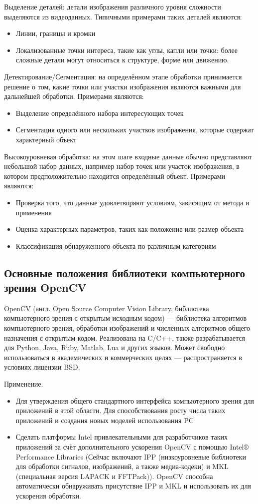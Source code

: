 \documentclass[12pt]{article}
\begin{document}
  Выделение деталей: детали изображения различного уровня сложности выделяются из видеоданных. Типичными примерами таких деталей являются:
\begin{itemize}
\item Линии, границы и кромки
\item Локализованные точки интереса, такие как углы, капли или точки: более сложные детали могут относиться к структуре, форме или движению.
\end{itemize}
Детектирование/Сегментация: на определённом этапе обработки принимается решение о том, какие точки или участки изображения являются важными для дальнейшей обработки. Примерами являются:
\begin{itemize}
\item Выделение определённого набора интересующих точек
\item Сегментация одного или нескольких участков изображения, которые содержат характерный объект
\end{itemize}

 Высокоуровневая обработка: на этом шаге входные данные обычно представляют небольшой набор данных, например набор точек или участок изображения, в котором предположительно находится определённый объект. Примерами являются:
\begin{itemize}
\item Проверка того, что данные удовлетворяют условиям, зависящим от метода и применения
\item Оценка характерных параметров, таких как положение или размер объекта
\item Классификация обнаруженного объекта по различным категориям
\end{itemize}	
	\subsection {Основные положения библиотеки компьютерного зрения OpenCV }
OpenCV (англ. Open Source Computer Vision Library, библиотека компьютерного зрения с открытым исходным кодом) — библиотека алгоритмов компьютерного зрения, обработки изображений и численных алгоритмов общего назначения с открытым кодом. Реализована на C/C++, также разрабатывается для Python, Java, Ruby, Matlab, Lua и других языков. Может свободно использоваться в академических и коммерческих целях — распространяется в условиях лицензии BSD.

Применение:

\begin{itemize}
  \item Для утверждения общего стандартного интерфейса компьютерного зрения для приложений в этой области. Для способствования росту числа таких приложений и создания новых моделей использования PC
  \item Сделать платформы Intel привлекательными для разработчиков таких приложений за счёт дополнительного ускорения OpenCV с помощью Intel® Performance Libraries (Сейчас включают IPP (низкоуровневые библиотеки для обработки сигналов, изображений, а также медиа-кодеки) и MKL (специальная версия LAPACK и FFTPack)). OpenCV способна автоматически обнаруживать присутствие IPP и MKL и использовать их для ускорения обработки.
\end{itemize}
\end{document}
